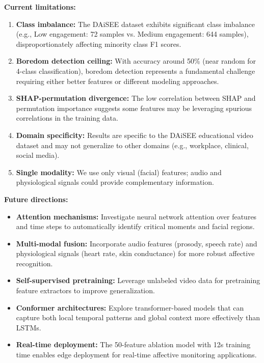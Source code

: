 \textbf{Current limitations:}
\begin{enumerate}
    \item \textbf{Class imbalance:} The DAiSEE dataset exhibits significant class imbalance (e.g., Low engagement: 72 samples vs. Medium engagement: 644 samples), disproportionately affecting minority class F1 scores.

    \item \textbf{Boredom detection ceiling:} With accuracy around 50\% (near random for 4-class classification), boredom detection represents a fundamental challenge requiring either better features or different modeling approaches.

    \item \textbf{SHAP-permutation divergence:} The low correlation between SHAP and permutation importance suggests some features may be leveraging spurious correlations in the training data.

    \item \textbf{Domain specificity:} Results are specific to the DAiSEE educational video dataset and may not generalize to other domains (e.g., workplace, clinical, social media).

    \item \textbf{Single modality:} We use only visual (facial) features; audio and physiological signals could provide complementary information.
\end{enumerate}

\textbf{Future directions:}
\begin{itemize}
    \item \textbf{Attention mechanisms:} Investigate neural network attention over features and time steps to automatically identify critical moments and facial regions.

    \item \textbf{Multi-modal fusion:} Incorporate audio features (prosody, speech rate) and physiological signals (heart rate, skin conductance) for more robust affective recognition.

    \item \textbf{Self-supervised pretraining:} Leverage unlabeled video data for pretraining feature extractors to improve generalization.

    \item \textbf{Conformer architectures:} Explore transformer-based models that can capture both local temporal patterns and global context more effectively than LSTMs.

    \item \textbf{Real-time deployment:} The 50-feature ablation model with 12s training time enables edge deployment for real-time affective monitoring applications.
\end{itemize}

